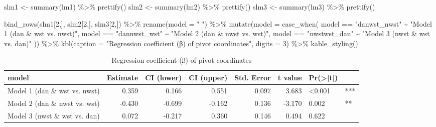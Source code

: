 \documentclass[
  12pt,
]{article}
\newenvironment{Shaded}{\begin{snugshade}}{\end{snugshade}}
\newcommand{\AttributeTok}[1]{\textcolor[rgb]{0.77,0.63,0.00}{#1}}
\newcommand{\DecValTok}[1]{\textcolor[rgb]{0.00,0.00,0.81}{#1}}
\newcommand{\FunctionTok}[1]{\textcolor[rgb]{0.00,0.00,0.00}{#1}}
\newcommand{\NormalTok}[1]{#1}
\newcommand{\OtherTok}[1]{\textcolor[rgb]{0.56,0.35,0.01}{#1}}
\newcommand{\SpecialCharTok}[1]{\textcolor[rgb]{0.00,0.00,0.00}{#1}}
\newcommand{\StringTok}[1]{\textcolor[rgb]{0.31,0.60,0.02}{#1}}
\begin{document}
\begin{Shaded}
\begin{Highlighting}[]
\NormalTok{slm1 }\OtherTok{\textless{}{-}} \FunctionTok{summary}\NormalTok{(lm1) }\SpecialCharTok{\%\textgreater{}\%} \FunctionTok{prettify}\NormalTok{()}
\NormalTok{slm2 }\OtherTok{\textless{}{-}} \FunctionTok{summary}\NormalTok{(lm2) }\SpecialCharTok{\%\textgreater{}\%} \FunctionTok{prettify}\NormalTok{()}
\NormalTok{slm3 }\OtherTok{\textless{}{-}} \FunctionTok{summary}\NormalTok{(lm3) }\SpecialCharTok{\%\textgreater{}\%} \FunctionTok{prettify}\NormalTok{()}

\FunctionTok{bind\_rows}\NormalTok{(slm1[}\DecValTok{2}\NormalTok{,], slm2[}\DecValTok{2}\NormalTok{,], slm3[}\DecValTok{2}\NormalTok{,]) }\SpecialCharTok{\%\textgreater{}\%} 
  \FunctionTok{rename}\NormalTok{(}\AttributeTok{model =} \StringTok{" "}\NormalTok{) }\SpecialCharTok{\%\textgreater{}\%} 
  \FunctionTok{mutate}\NormalTok{(}\AttributeTok{model =} \FunctionTok{case\_when}\NormalTok{(}
\NormalTok{    model }\SpecialCharTok{==} \StringTok{"danwst\_nwst"} \SpecialCharTok{\textasciitilde{}} \StringTok{"Model 1 (dan \& wst vs. nwst)"}\NormalTok{,}
\NormalTok{    model }\SpecialCharTok{==} \StringTok{"dannwst\_wst"} \SpecialCharTok{\textasciitilde{}} \StringTok{"Model 2 (dan \& nwst vs. wst)"}\NormalTok{,}
\NormalTok{    model }\SpecialCharTok{==} \StringTok{"nwstwst\_dan"} \SpecialCharTok{\textasciitilde{}} \StringTok{"Model 3 (nwst \& wst vs. dan)"}
\NormalTok{  )) }\SpecialCharTok{\%\textgreater{}\%} 
  \FunctionTok{kbl}\NormalTok{(}\AttributeTok{caption =} \StringTok{"Regression coefficient (β) of pivot coordinates"}\NormalTok{,}
      \AttributeTok{digits =} \DecValTok{3}\NormalTok{) }\SpecialCharTok{\%\textgreater{}\%}
  \FunctionTok{kable\_styling}\NormalTok{()}
\end{Highlighting}
\end{Shaded}

\begin{table}

\caption{\label{tab:tbl-prsh-CoDa-house-prices-lm}Regression coefficient (ß) of pivot coordinates}
\centering
\begin{tabular}[t]{l|r|r|r|r|r|l|l}
\hline
model & Estimate & CI (lower) & CI (upper) & Std. Error & t value & Pr(>|t|) &    \\
\hline
Model 1 (dan \& wst vs. nwst) & 0.359 & 0.166 & 0.551 & 0.097 & 3.683 & <0.001 & ***\\
\hline
Model 2 (dan \& nwst vs. wst) & -0.430 & -0.699 & -0.162 & 0.136 & -3.170 & 0.002 & **\\
\hline
Model 3 (nwst \& wst vs. dan) & 0.072 & -0.217 & 0.360 & 0.146 & 0.494 & 0.622 & \\
\hline
\end{tabular}
\end{table}
\end{document}
